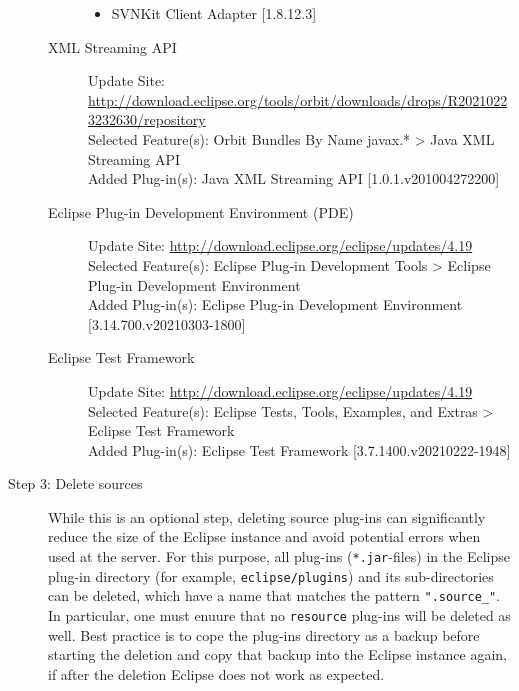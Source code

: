 \begin{description}
\begin{description}
\begin{itemize}
				\item SVNKit Client Adapter [1.8.12.3]
			\end{itemize}
			\item[XML Streaming API] $ $\\
			Update Site: \url{http://download.eclipse.org/tools/orbit/downloads/drops/R20210223232630/repository} \\
			Selected Feature(s): Orbit Bundles By Name javax.* > Java XML Streaming API \\
			Added Plug-in(s): Java XML Streaming API [1.0.1.v201004272200]
			\item[Eclipse Plug-in Development Environment (PDE)] $ $\\
			Update Site: \url{http://download.eclipse.org/eclipse/updates/4.19} \\
			Selected Feature(s): Eclipse Plug-in Development Tools > Eclipse Plug-in Development Environment \\
			Added Plug-in(s): Eclipse Plug-in Development Environment [3.14.700.v20210303-1800]
			\item[Eclipse Test Framework] $ $\\
			Update Site: \url{http://download.eclipse.org/eclipse/updates/4.19} \\
			Selected Feature(s): Eclipse Tests, Tools, Examples, and Extras > Eclipse Test Framework \\
			Added Plug-in(s): Eclipse Test Framework [3.7.1400.v20210222-1948]
		\end{description}
	\item[Step 3: Delete sources] $ $\\
		While this is an optional step, deleting source plug-ins can significantly reduce the size of the Eclipse instance and avoid potential errors when used at the server. For this purpose, all plug-ins (\texttt{*.jar}-files) in the Eclipse plug-in directory (for example, \texttt{eclipse/plugins}) and its sub-directories can be deleted, which have a name that matches the pattern \texttt{".source\_"}. In particular, one must enuure that no \texttt{resource} plug-ins will be deleted as well. Best practice is to cope the plug-ins directory as a backup before starting the deletion and copy that backup into the Eclipse instance again, if after the deletion Eclipse does not work as expected.
\end{description}

